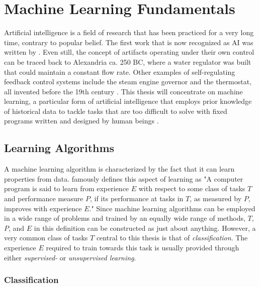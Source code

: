 \section{Machine Learning Fundamentals} \label{sec:bt/MLF}

Artificial intelligence is a field of research that has been practiced for a very long time, contrary to popular belief. The first work that is now recognized as AI was written by \textcite{mcculloch1943}. Even still, the concept of artifacts operating under their own control can be traced back to Alexandria ca. 250 BC, where a water regulator was built that could maintain a constant flow rate. Other examples of self-regulating feedback control systems include the steam engine governor and the thermostat, all invented before the 19th century \cite{russell2009}. This thesis will concentrate on machine learning, a particular form of artificial intelligence that employs prior knowledge of historical data to tackle tasks that are too difficult to solve with fixed programs written and designed by human beings \cite{goodfellow2016}.

\subsection{Learning Algorithms}

A machine learning algorithm is characterized by the fact that it can learn properties from data. \textcite{mitchell1997} famously defines this aspect of learning as "A computer program is said to learn from experience $E$ with respect to some class of tasks $T$ and performance measure $P$, if its performance at tasks in $T$, as measured by $P$, improves with experience $E$." Since machine learning algorithms can be employed in a wide range of problems and trained by an equally wide range of methods, $T$, $P$, and $E$ in this definition can be constructed as just about anything. However, a very common class of tasks $T$ central to this thesis is that of \textit{classification}. The experience $E$ required to train towards this task is usually provided through either \textit{supervised-} or \textit{unsupervised learning}. 

\subsubsection{Classification}


